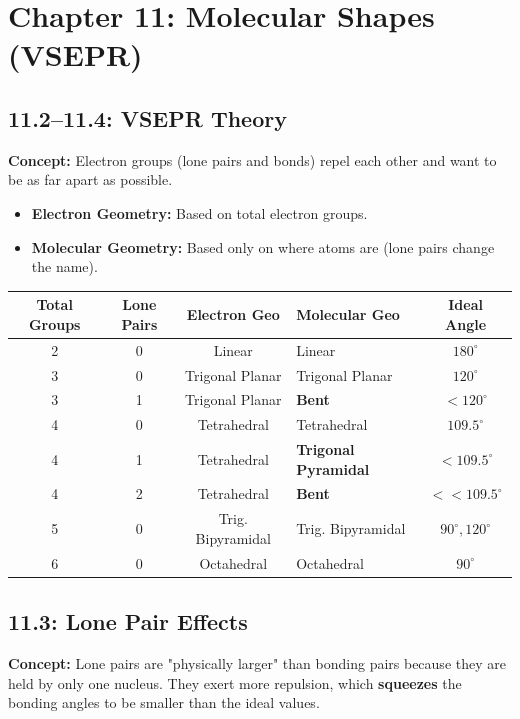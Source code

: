 \documentclass[11pt]{article}
\begin{document}
\newpage

\section{Chapter 11: Molecular Shapes (VSEPR)}

\subsection{11.2--11.4: VSEPR Theory}
\textbf{Concept:} Electron groups (lone pairs and bonds) repel each other and want to be as far apart as possible.
\begin{itemize}
    \item \textbf{Electron Geometry:} Based on total electron groups.
    \item \textbf{Molecular Geometry:} Based only on where atoms are (lone pairs change the name).
\end{itemize}

\begin{center}
\renewcommand{\arraystretch}{1.5}
\begin{tabular}{|c|c|c|l|c|}
\hline
\textbf{Total Groups} & \textbf{Lone Pairs} & \textbf{Electron Geo} & \textbf{Molecular Geo} & \textbf{Ideal Angle} \\ \hline
2 & 0 & Linear & Linear & $180^\circ$ \\ \hline
3 & 0 & Trigonal Planar & Trigonal Planar & $120^\circ$ \\ 
3 & 1 & Trigonal Planar & \textbf{Bent} & $<120^\circ$ \\ \hline
4 & 0 & Tetrahedral & Tetrahedral & $109.5^\circ$ \\ 
4 & 1 & Tetrahedral & \textbf{Trigonal Pyramidal} & $<109.5^\circ$ \\ 
4 & 2 & Tetrahedral & \textbf{Bent} & $<<109.5^\circ$ \\ \hline
5 & 0 & Trig. Bipyramidal & Trig. Bipyramidal & $90^\circ, 120^\circ$ \\ \hline
6 & 0 & Octahedral & Octahedral & $90^\circ$ \\ \hline
\end{tabular}
\end{center}

\subsection{11.3: Lone Pair Effects}
\textbf{Concept:} Lone pairs are "physically larger" than bonding pairs because they are held by only one nucleus. They exert more repulsion, which \textbf{squeezes} the bonding angles to be smaller than the ideal values.
\end{document}
